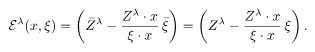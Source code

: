 \begin{equation}
{\cal
E}^{\lambda}(x,\xi)=\left(\bar{Z}^{\lambda}-\frac{Z^{\lambda}\cdot
x}{\xi\cdot x
}\,\bar{\xi}\right)=\left({Z}^{\lambda}-\frac{Z^{\lambda}\cdot
x}{\xi\cdot x}\,{\xi}\right).
\end{equation}


